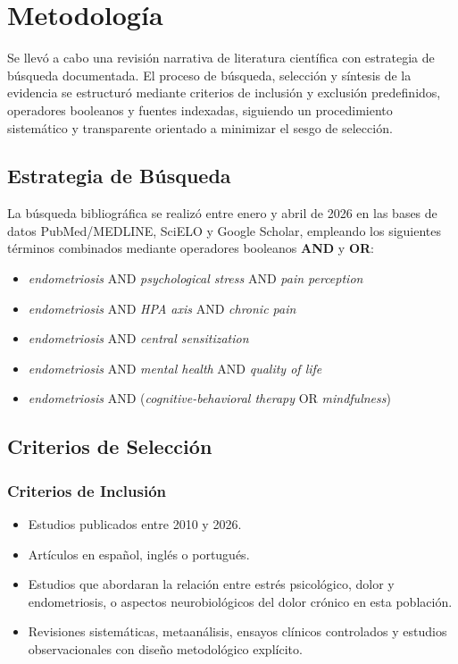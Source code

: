 \documentclass[12pt, a4paper]{article}
\begin{document}
\section{Metodología}

Se llevó a cabo una revisión narrativa de literatura científica con estrategia de búsqueda
documentada. El proceso de búsqueda, selección y síntesis de la evidencia se estructuró
mediante criterios de inclusión y exclusión predefinidos, operadores booleanos y fuentes
indexadas, siguiendo un procedimiento sistemático y transparente orientado a minimizar el
sesgo de selección.

\subsection{Estrategia de Búsqueda}

La búsqueda bibliográfica se realizó entre enero y abril de 2026 en las bases de datos
PubMed/MEDLINE, SciELO y Google Scholar, empleando los siguientes términos combinados
mediante operadores booleanos \textbf{AND} y \textbf{OR}:

\begin{itemize}
  \item \textit{endometriosis} AND \textit{psychological stress} AND \textit{pain perception}
  \item \textit{endometriosis} AND \textit{HPA axis} AND \textit{chronic pain}
  \item \textit{endometriosis} AND \textit{central sensitization}
  \item \textit{endometriosis} AND \textit{mental health} AND \textit{quality of life}
  \item \textit{endometriosis} AND (\textit{cognitive-behavioral therapy} OR \textit{mindfulness})
\end{itemize}

\subsection{Criterios de Selección}

\subsubsection{Criterios de Inclusión}

\begin{itemize}
  \item Estudios publicados entre 2010 y 2026.
  \item Artículos en español, inglés o portugués.
  \item Estudios que abordaran la relación entre estrés psicológico, dolor y endometriosis,
        o aspectos neurobiológicos del dolor crónico en esta población.
  \item Revisiones sistemáticas, metaanálisis, ensayos clínicos controlados y estudios
        observacionales con diseño metodológico explícito.
\end{itemize}
\end{document}
